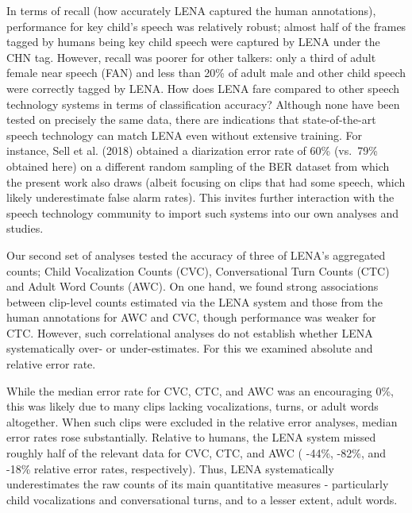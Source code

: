 \documentclass[english,floatsintext,man]{apa6}
\begin{document}
In terms of recall (how accurately LENA captured the human annotations),
performance for key child's speech was relatively robust; almost half of
the frames tagged by humans being key child speech were captured by LENA
under the CHN tag. However, recall was poorer for other talkers: only a
third of adult female near speech (FAN) and less than 20\% of adult male
and other child speech were correctly tagged by LENA. How does LENA fare
compared to other speech technology systems in terms of classification
accuracy? Although none have been tested on precisely the same data,
there are indications that state-of-the-art speech technology can match
LENA even without extensive training. For instance, Sell et al. (2018)
obtained a diarization error rate of 60\% (vs.~79\% obtained here) on a
different random sampling of the BER dataset from which the present work
also draws (albeit focusing on clips that had some speech, which likely
underestimate false alarm rates). This invites further interaction with
the speech technology community to import such systems into our own
analyses and studies.

Our second set of analyses tested the accuracy of three of LENA's
aggregated counts; Child Vocalization Counts (CVC), Conversational Turn
Counts (CTC) and Adult Word Counts (AWC). On one hand, we found strong
associations between clip-level counts estimated via the LENA system and
those from the human annotations for AWC and CVC, though performance was
weaker for CTC. However, such correlational analyses do not establish
whether LENA systematically over- or under-estimates. For this we
examined absolute and relative error rate.

While the median error rate for CVC, CTC, and AWC was an encouraging
0\%, this was likely due to many clips lacking vocalizations, turns, or
adult words altogether. When such clips were excluded in the relative
error analyses, median error rates rose substantially. Relative to
humans, the LENA system missed roughly half of the relevant data for
CVC, CTC, and AWC ( -44\%, -82\%, and -18\% relative error rates,
respectively). Thus, LENA systematically underestimates the raw counts
of its main quantitative measures - particularly child vocalizations and
conversational turns, and to a lesser extent, adult words.
\end{document}
